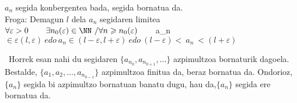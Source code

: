 \begin{propietate}
\item
${a_{n} }$ segida konbergentea bada, segida bornatua da.\\ 

{Froga:} Demagun $l$ dela ${a_{n} }$ segidaren limitea\\

$\forall \varepsilon > 0 \hspace{0.75cm}\exists n_{0}(\varepsilon)\in \NN \ / \forall n\geqslant n_{0}(\varepsilon)\hspace{0.75cm}${a_{n} }$\in \varepsilon(l,\varepsilon)\ edo \ {a_{n} }\in(l-\varepsilon, l+\varepsilon)\ edo \ (l-\varepsilon)< \ {a_{n} } \ <(l+\varepsilon)$

\ Horrek esan nahi du segidaren $\lbrace {a_{n}_{0}}, {a_{n}_{0+1}},... \rbrace$ azpimultzoa bornaturik dagoela. Bestalde, $\lbrace {a_{1} },{a_{2} },...,{a_{n}_{0-1}} \rbrace$ azpimultzoa finitua da, beraz bornatua da.
Ondorioz, $\lbrace{a_{n} }\rbrace$ segida bi azpimultzo bornatuan banatu dugu, hau da,$\lbrace{a_{n} }\rbrace$ segida ere bornatua da.\
\end{propietate}

